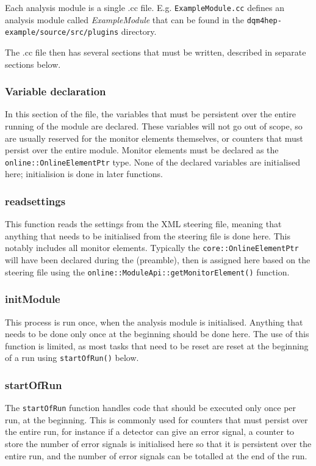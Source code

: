 Each analysis module is a single .cc file. E.g. \texttt{ExampleModule.cc} defines an analysis module called \textit{ExampleModule} that can be found in the \texttt{dqm4hep-example/source/src/plugins} directory.

The .cc file then has several sections that must be written, described in separate sections below.

\subsubsection{Variable declaration}
In this section of the file, the variables that must be persistent over the entire running of the module are declared. These variables will not go out of scope, so are usually reserved for the monitor elements themselves, or counters that must persist over the entire module. Monitor elements must be declared as the \texttt{online::OnlineElementPtr} type. None of the declared variables are initialised here; initialision is done in later functions.

\subsubsection{readsettings}
This function reads the settings from the XML steering file, meaning that anything that needs to be initialised from the steering file is done here. This notably includes all monitor elements. Typically the \texttt{core::OnlineElementPtr} will have been declared during the (preamble), then is assigned here based on the steering file using the \texttt{online::ModuleApi::getMonitorElement()} function. 

\subsubsection{initModule}
This process is run once, when the analysis module is initialised. Anything that needs to be done only once at the beginning should be done here. The use of this function is limited, as most tasks that need to be reset are reset at the beginning of a run using \texttt{startOfRun()} below.

\subsubsection{startOfRun}
The \texttt{startOfRun} function handles code that should be executed only once per run, at the beginning. This is commonly used for counters that must persist over the entire run, for instance if a detector can give an error signal, a counter to store the number of error signals is initialised here so that it is persistent over the entire run, and the number of error signals can be totalled at the end of the run.

